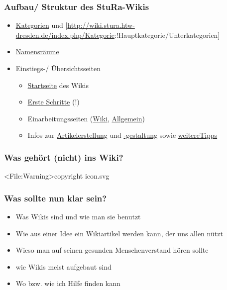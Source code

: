 \documentclass{beamer}
\begin{document}
\begin{frame}
  \frametitle{Aufbau/ Struktur des StuRa-Wikis}
  \begin{itemize}
    \item \href{http://wiki.stura.htw-dresden.de/index.php/Spezial:Kategorien}{Kategorien} und [\url{http://wiki.stura.htw-dresden.de/index.php/Kategorie}:!Hauptkategorie/Unterkategorien]
    \item \href{http://wiki.stura.htw-dresden.de/index.php/Admin:Namensr\%C3\%A4ume}{Namensräume}
    \item Einstiegs-/ Übersichtsseiten
    \begin{itemize}
      \item \href{http://wiki.stura.htw-dresden.de/index.php/Hauptseite}{Startseite} des Wikis
      \item \href{http://wiki.stura.htw-dresden.de/index.php/StuRa_HTW_Dresden:Erste_Schritte}{Erste Schritte} (!)
      \item Einarbeitungsseiten (\href{http://wiki.stura.htw-dresden.de/index.php/Wiki/Einarbeitung}{Wiki}, \href{http://wiki.stura.htw-dresden.de/index.php/Einarbeitung}{Allgemein})
      \item Infos zur \href{http://wiki.stura.htw-dresden.de/index.php/Artikelerstellung}{Artikelerstellung} und \href{http://wiki.stura.htw-dresden.de/index.php/Admin:Artikelgestaltung}{-gestaltung} sowie \href{https://de.wikipedia.org/wiki/Wikipedia:Wie_schreibe_ich_gute_Artikel}{weitereTipps}
    \end{itemize}
  \end{itemize}
\end{frame}


\begin{frame}
  \frametitle{Was gehört (nicht) ins Wiki?}

  \textless File:Warning\textgreater  copyright icon.svg

\end{frame}

  
\begin{frame}
  \frametitle{Was sollte nun klar sein?}
  \begin{itemize}
    \item Was Wikis sind und wie man sie benutzt
    \item Wie aus einer Idee ein Wikiartikel werden kann, der uns allen nützt
    \item Wieso man auf seinen gesunden Menschenverstand hören sollte
    \item wie Wikis meist aufgebaut sind
    \item Wo bzw. wie ich Hilfe finden kann
  \end{itemize}
\end{frame}
\end{document}

